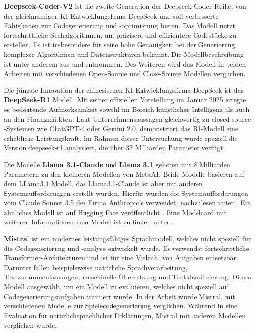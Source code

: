 \textbf{Deepseek-Coder-V2} ist die zweite Generation der Deepseek-Coder-Reihe, von der gleichnamigen KI-Entwicklungsfirma DeepSeek und soll verbesserte Fähigkeiten zur Codegenerierung und -optimierung bieten. Das Modell nutzt fortschrittliche Suchalgorithmen, um präzisere und effizientere Codestücke zu erstellen. Es ist insbesondere für seine hohe Genauigkeit bei der Generierung komplexer Algorithmen und Datenstrukturen bekannt. Die Modellbeschreibung ist unter anderem aus \cite{deepseek-ai-2024} und \cite{cui-2024} entnommen. Des Weiteren wird das Modell in beiden Arbeiten mit verschiedenen Open-Source und Close-Source Modellen verglichen.\vspace{0.2cm} 

Die jüngste Innovation der chinesischen KI-Entwicklungsfirma DeepSeek ist das \textbf{DeepSeek-R1} Modell. Mit seiner offiziellen Vorstellung im Januar 2025 erregte es bedeutende Aufmerksamkeit sowohl im Bereich künstlicher Intelligenz als auch an den Finanzmärkten. Laut Unternehmensaussagen gleichwertig zu closed-source -Systemen wie ChatGPT-4 oder Gemini 2.0, demonstriert das R1-Modell eine erhebliche Leistungskraft. Im Rahmen dieser Untersuchung wurde speziell die Version deepseek-r1 analysiert, die über 32 Milliarden Parameter verfügt.\vspace{0.2cm}

Die Modelle \textbf{Llama 3.1-Claude} und \textbf{Llama 3.1} gehören mit 8 Milliarden Parametern zu den kleineren Modellen von MetaAI. Beide Modelle basieren auf dem LLama3.1 Modell, das Llama3.1-Claude ist aber mit anderen Systemaufforderungen erstellt wurden. Hierfür wurden die Systemaufforderungen vom Claude Sonnet 3.5 der Firma Anthropic’s verwendet, nachzulesen unter \cite{ollama_page_llama31_claude}. Ein ähnliches Modell ist auf Hugging Face veröffentlicht \cite{huggingface_page_llama31_claude}. Eine Modelcard mit weiteren Informationen zum Modell ist zu finden unter \cite{meta-llama-no-date}.\vspace{0.2cm}

\textbf{Mistral} ist ein modernes leistungsfähiges Sprachmodell, welches nicht speziell für die Codegenerierung und -analyse entwickelt wurde. Es verwendet fortschrittliche Transformer-Architekturen und ist für eine Vielzahl von Aufgaben einsetzbar. Darunter fallen beispielsweise natürliche Sprachverarbeitung, Textzusammenfassungen, maschinelle Übersetzung und Textklassifizierung. Dieses Modell ausgewählt, um ein Modell zu evaluieren, welches nicht speziell auf Codegenerierungsaufgaben trainiert wurde. In der Arbeit \cite{eberhardinger-2024} wurde Mistral, mit verschiedenen Modelle zur Spielecodegenerierung verglichen. Während in \cite{quan-2024} eine Evaluation für natürlichsprachlicher Erklärungen, Mistral mit anderen Modellen verglichen wurde.\vspace{0.2cm}

